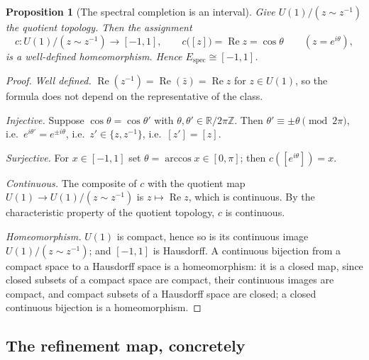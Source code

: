 \documentclass[11pt,reqno]{amsart}
\theoremstyle{plain}
\newtheorem{proposition}[theorem]{Proposition}
\theoremstyle{definition}
\theoremstyle{remark}
\numberwithin{equation}{section}
\DeclareMathOperator{\Real}{Re}
\begin{document}
\begin{proposition}[The spectral completion is an interval]
\label{prop:interval}
Give $U(1)/(z\sim z^{-1})$ the quotient topology. Then the assignment
\begin{equation}
\label{eq:cos}
c\colon U(1)/(z\sim z^{-1})\longrightarrow[-1,1],
\qquad
c\bigl([z]\bigr)=\Real z=\cos\theta
\qquad(z=e^{i\theta}),
\end{equation}
is a well-defined homeomorphism. Hence $E_{\mathrm{spec}}\cong[-1,1]$.
\end{proposition}

\begin{proof}
\emph{Well defined.} $\Real(z^{-1})=\Real(\bar z)=\Real z$ for $z\in U(1)$, so the formula does not
depend on the representative of the class.

\emph{Injective.} Suppose $\cos\theta=\cos\theta'$ with $\theta,\theta'\in\mathbb{R}/2\pi\mathbb{Z}$.
Then $\theta'\equiv\pm\theta\pmod{2\pi}$, i.e.\ $e^{i\theta'}=e^{\pm i\theta}$, i.e.\ $z'\in\{z,z^{-1}\}$,
i.e.\ $[z']=[z]$.

\emph{Surjective.} For $x\in[-1,1]$ set $\theta=\arccos x\in[0,\pi]$; then $c([e^{i\theta}])=x$.

\emph{Continuous.} The composite of $c$ with the quotient map $U(1)\to U(1)/(z\sim z^{-1})$ is
$z\mapsto\Real z$, which is continuous. By the characteristic property of the quotient topology, $c$
is continuous.

\emph{Homeomorphism.} $U(1)$ is compact, hence so is its continuous image $U(1)/(z\sim z^{-1})$; and
$[-1,1]$ is Hausdorff. A continuous bijection from a compact space to a Hausdorff space is a
homeomorphism: it is a closed map, since closed subsets of a compact space are compact, their
continuous images are compact, and compact subsets of a Hausdorff space are closed; a closed
continuous bijection is a homeomorphism.
\end{proof}

\subsection{The refinement map, concretely}
\end{document}
